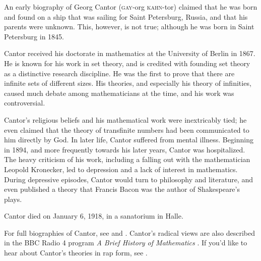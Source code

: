 \documentclass[../../../include/open-logic-section]{subfiles}
\begin{document}



An early biography of Georg Cantor (\textsc{gay}-org
\textsc{kahn}-tor) claimed that he was born and found on a ship that
was sailing for Saint Petersburg, Russia, and that his parents were
unknown. This, however, is not true; although he was born in Saint
Petersburg in 1845.

Cantor received his doctorate in mathematics at the University of Berlin in
1867. He is known for his work in set theory, and is credited with founding
set theory as a distinctive research discipline.
He was the first to prove that there are infinite sets of different sizes.
His theories, and especially his theory of infinities, caused much debate
among mathematicians at the time, and his work was controversial.

Cantor's religious beliefs and his mathematical work were inextricably
tied; he even claimed that the theory of transfinite numbers had been
communicated to him directly by God. In later life, Cantor suffered
from mental illness. Beginning in 1894, and more frequently towards
his later years, Cantor was hospitalized.  The heavy criticism of his
work, including a falling out with the mathematician Leopold
Kronecker, led to depression and a lack of interest in
mathematics. During depressive episodes, Cantor would turn to
philosophy and literature, and even published a theory that Francis Bacon
was the author of Shakespeare's plays.

Cantor died on January 6, 1918, in a sanatorium in Halle.

\begin{reading} 
For full biographies of Cantor, see \citet{Dauben1990} and
\citet{Grattan-Guinness1971}.  Cantor's radical views are also
described in the BBC Radio 4 program \emph{A Brief History of
  Mathematics} \citep{Sautoy2014}.  If you'd like to hear about
Cantor's theories in rap form, see \citet{Rose2012}.
\end{reading}
\end{document}
